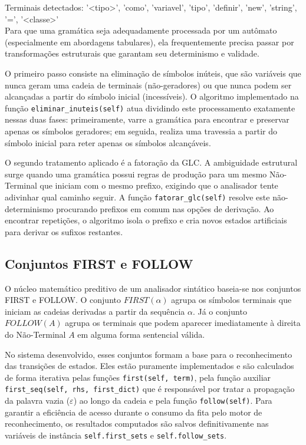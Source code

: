 \documentclass[12pt, a4paper]{article}
\begin{document}
Terminais detectados: {'<tipo>', 'como', 'variavel', 'tipo', 'definir', 'new', 'string', '=', '<classe>'}\\
	Para que uma gramática seja adequadamente processada por um autômato (especialmente em abordagens tabulares), ela frequentemente precisa passar por transformações estruturais que garantam seu determinismo e validade.

	O primeiro passo consiste na eliminação de símbolos inúteis, que são variáveis que nunca geram uma cadeia de terminais (não-geradores) ou que nunca podem ser alcançadas a partir do símbolo inicial (incessíveis). O algoritmo implementado na função \texttt{eliminar\_inuteis(self)} atua dividindo este processamento exatamente nessas duas fases: primeiramente, varre a gramática para encontrar e preservar apenas os símbolos geradores; em seguida, realiza uma travessia a partir do símbolo inicial para reter apenas os símbolos alcançáveis.

	O segundo tratamento aplicado é a fatoração da GLC. A ambiguidade estrutural surge quando uma gramática possui regras de produção para um mesmo Não-Terminal que iniciam com o mesmo prefixo, exigindo que o analisador tente adivinhar qual caminho seguir. A função \texttt{fatorar\_glc(self)} resolve este não-determinismo procurando prefixos em comum nas opções de derivação. Ao encontrar repetições, o algoritmo isola o prefixo e cria novos estados artificiais para derivar os sufixos restantes.

	\subsection{Conjuntos FIRST e FOLLOW}
	O núcleo matemático preditivo de um analisador sintático baseia-se nos conjuntos FIRST e FOLLOW. O conjunto $FIRST(\alpha)$ agrupa os símbolos terminais que iniciam as cadeias derivadas a partir da sequência $\alpha$. Já o conjunto $FOLLOW(A)$ agrupa os terminais que podem aparecer imediatamente à direita do Não-Terminal $A$ em alguma forma sentencial válida.

	No sistema desenvolvido, esses conjuntos formam a base para o reconhecimento das transições de estados. Eles estão puramente implementados e são calculados de forma iterativa pelas funções \texttt{first(self, term)}, pela função auxiliar \texttt{first\_seq(self, rhs, first\_dict)} que é responsável por tratar a propagação da palavra vazia ($\varepsilon$) ao longo da cadeia e pela função \texttt{follow(self)}. Para garantir a eficiência de acesso durante o consumo da fita pelo motor de reconhecimento, os resultados computados são salvos definitivamente nas variáveis de instância \texttt{self.first\_sets} e \texttt{self.follow\_sets}.
\end{document}

